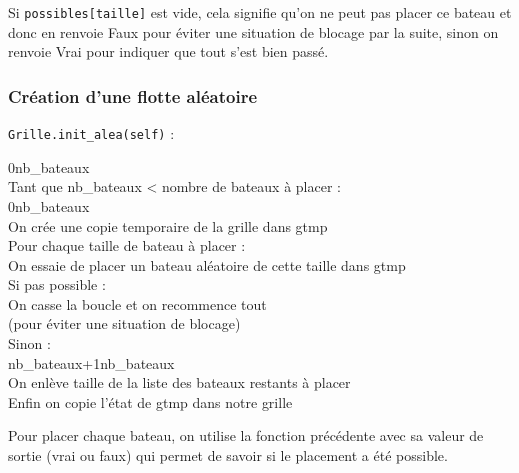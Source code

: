 Si \texttt{possibles[taille]} est vide, cela signifie qu'on ne peut pas placer ce bateau et donc en renvoie Faux pour éviter une situation de blocage par la suite, sinon on renvoie Vrai pour indiquer que tout s'est bien passé.

\subsubsection{Création d'une flotte aléatoire}\label{init_alea}
\texttt{Grille.init\_alea(self)} :
\begin{algo1}
0\sto nb\_bateaux\\
Tant que nb\_bateaux < nombre de bateaux à placer :\\
0\sto nb\_bateaux\\
On crée une copie temporaire de la grille dans gtmp\\
Pour chaque taille de bateau à placer :\\
On essaie de placer un bateau aléatoire de cette taille dans gtmp\\
Si pas possible :\\
On casse la boucle et on recommence tout\\
(pour éviter une situation de blocage)\\
Sinon :\\
nb\_bateaux+1\sto nb\_bateaux\\
On enlève taille de la liste des bateaux restants à placer\\
Enfin on copie l'état de gtmp dans notre grille \\
\end{algo1}

Pour placer chaque bateau, on utilise la fonction précédente avec sa valeur de sortie (vrai ou faux) qui permet de savoir si le placement a été possible.

